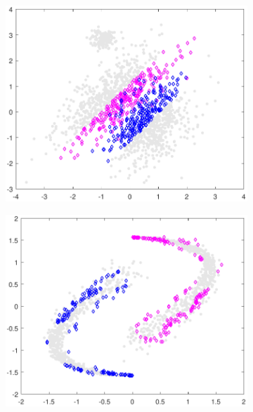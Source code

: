 \documentclass[preprint,12pt]{elsarticle}
\begin{document}
\begin{figure}[!htb]
	\begin{subfigure}[b]{0.40\linewidth}
		\centering\includegraphics[width=1\linewidth]{figures/normdatamodel_landm2.pdf}
		\caption{\label{fig:ROI1}} 
	\end{subfigure} 
	\begin{subfigure}[b]{0.40\linewidth}
		\centering\includegraphics[width=1\linewidth]{figures/yydatamodel_landm2.pdf}
		\caption{\label{fig:ROI2}}
	\end{subfigure} \\
	

\end{figure}
\end{document}
